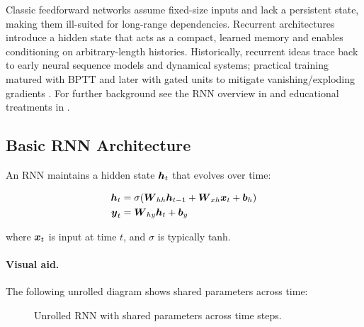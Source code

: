 Classic feedforward networks assume fixed-size inputs and lack a persistent state, making them ill-suited for long-range dependencies. Recurrent architectures introduce a hidden state that acts as a compact, learned memory  and enables conditioning on arbitrary-length histories. Historically, recurrent ideas trace back to early neural sequence models and dynamical systems; practical training matured with BPTT \cite{Rumelhart1986} and later with gated units to mitigate vanishing/exploding gradients \cite{Hochreiter1997}. For further background see the RNN overview in \cite{GoodfellowEtAl2016} and educational treatments in \cite{D2LChapterRNN,WebRNNWikipedia,WebDLBRNN}.


\subsection{Basic RNN Architecture}

An RNN maintains a hidden state $\boldsymbol{h}_t$ that evolves over time:

\begin{align}
\boldsymbol{h}_t &= \sigma(\boldsymbol{W}_{hh} \boldsymbol{h}_{t-1} + \boldsymbol{W}_{xh} \boldsymbol{x}_t + \boldsymbol{b}_h) \\
\boldsymbol{y}_t &= \boldsymbol{W}_{hy} \boldsymbol{h}_t + \boldsymbol{b}_y
\end{align}

where $\boldsymbol{x}_t$ is input at time $t$, and $\sigma$ is typically tanh.

\paragraph{Visual aid.} The following unrolled diagram shows shared parameters across time:
\begin{figure}[h]
    \centering
    \caption{Unrolled RNN with shared parameters across time steps.}
\end{figure}

